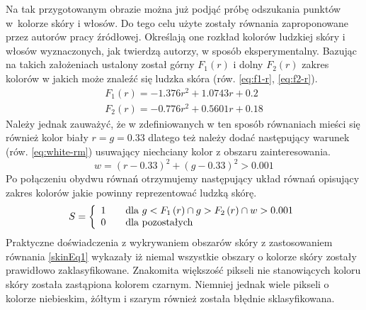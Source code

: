 Na tak przygotowanym obrazie można już podjąć próbę odszukania punktów w~kolorze
skóry i włosów. Do tego celu użyte zostały równania zaproponowane przez autorów
pracy źródłowej. Określają one rozkład kolorów ludzkiej skóry i włosów
wyznaczonych, jak twierdzą autorzy, w sposób eksperymentalny. Bazując na takich
założeniach ustalony został górny $F_1(r)$ i dolny $F_2(r)$ zakres kolorów w
jakich może znaleźć się ludzka skóra (rów. \ref{eq:f1-r}, \ref{eq:f2-r}).
\begin{eqnarray}
\label{eq:f1-r}
F_1\left(r\right) = -1.376r^2 + 1.0743r + 0.2\\
\label{eq:f2-r}
F_2\left(r\right) = -0.776r^2 + 0.5601r + 0.18
\end{eqnarray}
Należy jednak zauważyć, że w zdefiniowanych w ten sposób równaniach mieści się
również kolor biały $r = g = 0.33$ dlatego też należy dodać następujący
warunek (rów. \ref{eq:white-rm}) usuwający niechciany kolor z obszaru
zainteresowania.
\begin{equation}
\label{eq:white-rm}
w = \left(r - 0.33\right)^2 + \left(g - 0.33\right)^2 > 0.001
\end{equation}
Po połączeniu obydwu równań otrzymujemy następujący układ równań opisujący
zakres kolorów jakie powinny reprezentować ludzką skórę. 
\begin{equation}
S = \left\{ 
\begin{array}{l l}
  1 & \quad \mbox{dla $g < F_1\left(r\right) \cap g > F_2\left(r\right) \cap w
  > 0.001$}\\ 0 & \quad \mbox{dla pozostałych}\\ \end{array} \right. 
  \label{skinEq1}
\end{equation}
Praktyczne doświadczenia z wykrywaniem obszarów skóry z zastosowaniem równania
\ref{skinEq1} wykazały iż niemal wszystkie obszary o kolorze skóry zostały
prawidłowo zaklasyfikowane. Znakomita większość pikseli nie stanowiących koloru
skóry została zastąpiona kolorem czarnym. Niemniej jednak wiele pikseli o
kolorze niebieskim, żółtym i szarym również została błędnie sklasyfikowana. 

